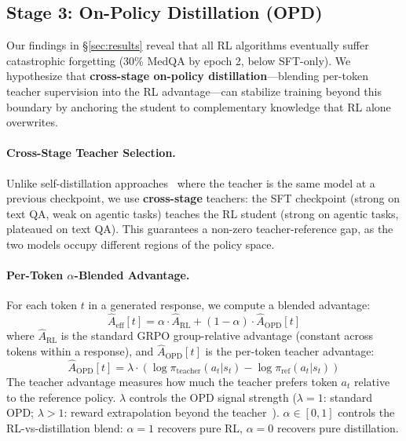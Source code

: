\documentclass{article}
\begin{document}
\subsection{Stage 3: On-Policy Distillation (OPD)}
\label{sec:opd}

Our findings in \S\ref{sec:results} reveal that all RL algorithms eventually suffer catastrophic forgetting (30\% MedQA by epoch 2, below SFT-only). We hypothesize that \textbf{cross-stage on-policy distillation}---blending per-token teacher supervision into the RL advantage---can stabilize training beyond this boundary by anchoring the student to complementary knowledge that RL alone overwrites.

\paragraph{Cross-Stage Teacher Selection.}
Unlike self-distillation approaches~\citep{gopd2026, mimo2026} where the teacher is the same model at a previous checkpoint, we use \textbf{cross-stage} teachers: the SFT checkpoint (strong on text QA, weak on agentic tasks) teaches the RL student (strong on agentic tasks, plateaued on text QA). This guarantees a non-zero teacher-reference gap, as the two models occupy different regions of the policy space.

\paragraph{Per-Token $\alpha$-Blended Advantage.}
For each token $t$ in a generated response, we compute a blended advantage:
\begin{equation}
    \hat{A}_{\text{eff}}[t] = \alpha \cdot \hat{A}_{\text{RL}} + (1 - \alpha) \cdot \hat{A}_{\text{OPD}}[t]
\label{eq:opd_advantage}
\end{equation}
where $\hat{A}_{\text{RL}}$ is the standard GRPO group-relative advantage (constant across tokens within a response), and $\hat{A}_{\text{OPD}}[t]$ is the per-token teacher advantage:
\begin{equation}
    \hat{A}_{\text{OPD}}[t] = \lambda \cdot \left(\log \pi_{\text{teacher}}(a_t | s_t) - \log \pi_{\text{ref}}(a_t | s_t)\right)
\label{eq:opd_token}
\end{equation}
The teacher advantage measures how much the teacher prefers token $a_t$ relative to the reference policy. $\lambda$ controls the OPD signal strength ($\lambda = 1$: standard OPD; $\lambda > 1$: reward extrapolation beyond the teacher~\citep{gopd2026}). $\alpha \in [0, 1]$ controls the RL-vs-distillation blend: $\alpha = 1$ recovers pure RL, $\alpha = 0$ recovers pure distillation.
\end{document}

